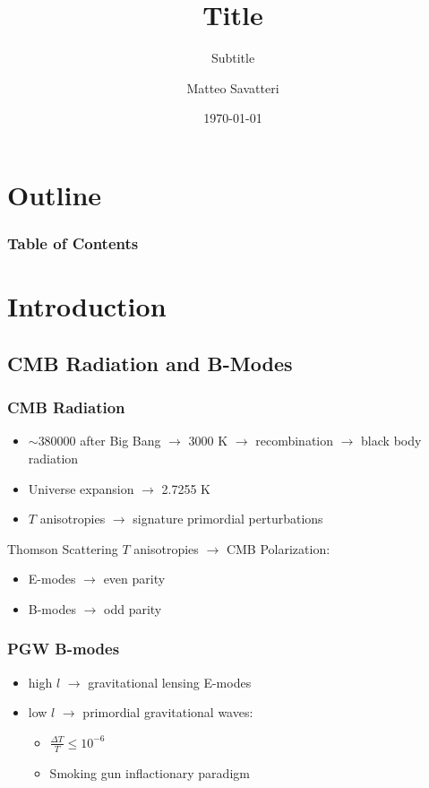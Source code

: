 \documentclass[10pt]{beamer}
\title{Title}
\subtitle{Subtitle}
\author{Matteo Savatteri}
\institute{Università degli Studi di Milano}
\date{\today}
\begin{document}
\frame{\titlepage}

\section*{Outline}
\begin{frame}
\frametitle{Table of Contents}
\tableofcontents
\end{frame}

\section{Introduction}
\subsection{CMB Radiation and B-Modes}

\begin{frame}
\frametitle{CMB Radiation}

\begin{itemize}
\item $\sim$380000 after Big Bang $\rightarrow$ 3000 K $\rightarrow$ recombination $\rightarrow$
      black body radiation \pause
\item Universe expansion $\rightarrow$ 2.7255 K \pause
\item $T$ anisotropies $\rightarrow$ signature primordial perturbations \pause
\end{itemize}

\vspace{15pt}

Thomson Scattering $T$ anisotropies $\rightarrow$ CMB Polarization: \pause
\begin{itemize}
\item E-modes $\rightarrow$ even parity \pause
\item B-modes $\rightarrow$ odd parity
\end{itemize} 

\end{frame}

\begin{frame}
\frametitle{PGW B-modes}

\begin{itemize}
\pause
\item high $l$ $\rightarrow$ gravitational lensing E-modes\pause
\item low $l$ $\rightarrow$ \alert{primordial gravitational waves}: \pause
\begin{itemize}
\item $\frac{\Delta T}{T} \leq 10^{-6}$ \pause
\item Smoking gun inflactionary paradigm
\end{itemize}
\end{itemize}

\end{frame}
\end{document}
